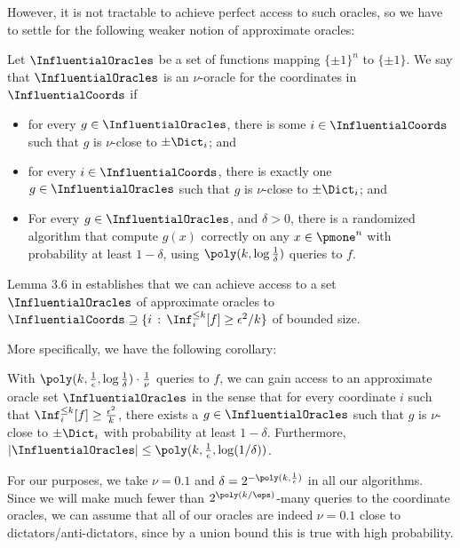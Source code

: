However, it is not tractable to achieve perfect access to such oracles, so we have to settle for the following weaker notion of approximate oracles:
\begin{definition}
\label{definition:approx-oracles}
Let $\InfluentialOracles$ be a set of functions mapping $\{ \pm 1\}^n$ to $\{ \pm 1\}$. We say that $\InfluentialOracles$ is an $\nu$-oracle for the coordinates in $\InfluentialCoords$ if

\begin{itemize}
    \item for every $g \in \InfluentialOracles$, there is some $i \in \InfluentialCoords$ such that $g$ is $\nu$-close to $\pm \Dict_i$; and
    \item for every $i \in \InfluentialCoords$, there is exactly one $g \in \InfluentialOracles$ such that $g$  is $\nu$-close to $\pm \Dict_i$; and
    \item For every $g \in \InfluentialOracles$, and $\delta > 0$, there is a randomized algorithm that compute $g(x)$ correctly on any $x \in \pmone^n$ with probability at least $1-\delta$, using $\poly(k, \log \frac{1}{\delta})$ queries to $f$.
\end{itemize}
\end{definition}


 Lemma 3.6 in \cite{junta-coordinate-oracles} establishes that we can achieve access to a set $\InfluentialOracles$ of approximate oracles to $\InfluentialCoords \supseteq \{i\,: \, \Inf_i^{\leq k}[f] \geq \epsilon^2/k\}$ of bounded size. 

More specifically, we have the following corollary:

\begin{corollary}
\label{corollary:get-oracles}
With $\poly(k, \frac{1}{\epsilon}, \log \frac{1}{\delta})\cdot \frac{1}{\nu}$ queries to $f$, we can gain access to an approximate oracle set $\InfluentialOracles$ in the sense that for every coordinate $i$ such that $\Inf_i^{\leq k}[f] \geq \frac{\epsilon^2}{k}$, there exists a $g \in \InfluentialOracles$ such that $g$ is $\nu$-close to $\pm \Dict_i$ with probability at least $1-\delta$. Furthermore, $|\InfluentialOracles|\leq \poly(k, \frac{1}{\epsilon}, \log(1/\delta))$.
\end{corollary}

For our purposes, we take $\nu = 0.1$ and $\delta = 2^{-\poly(k, \frac{1}{\epsilon})}$ in all our  algorithms. Since we will  make much fewer than $2^{\poly(k/\eps)}$-many queries to the coordinate oracles,  we can assume that all of our oracles are indeed $\nu = 0.1$ close to dictators/anti-dictators, since by a union bound this is true with high probability.

